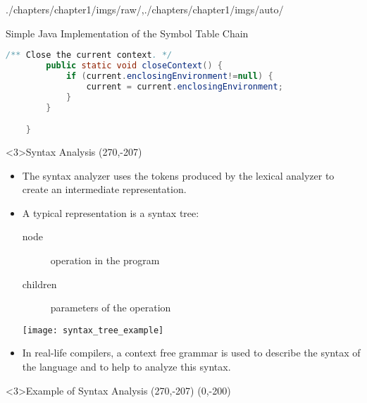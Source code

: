 \begin{graphicspathcontext}{{./chapters/chapter1/imgs/raw/},{./chapters/chapter1/imgs/auto/}}
\begin{bibunit}[apalike]
\begin{frame}[fragile]{Simple Java Implementation of the Symbol Table Chain}
\begin{lstlisting}[language=Java]
	    /** Close the current context. */
	    public static void closeContext() {
	        if (current.enclosingEnvironment!=null) {
	            current = current.enclosingEnvironment;
	        }
	    }

	}
	\end{lstlisting}
\end{frame}

\begin{frame}<3>{Syntax Analysis}
	\putat(270,-207){}
	\begin{minipage}{.8\linewidth}
	\begin{itemize}
	\item The syntax analyzer uses the tokens produced by the lexical analyzer to create an intermediate representation.
	\item A typical representation is a syntax tree: \begin{description}
		\item[node] operation in the program
		\item[children] parameters of the operation
		\end{description}
		\vspace{1em}
		\texttt{[image: syntax\_tree\_example]}
		\vspace{1em}
	\item In real-life compilers, a context free grammar is used to describe the syntax of the language and to help to analyze this syntax.
	\end{itemize}
	\end{minipage}
\end{frame}

\begin{frame}<3>{Example of Syntax Analysis}
	\putat(270,-207){}
	\putat(0,-200){}
\end{frame}


\end{bibunit}
\end{graphicspathcontext}
